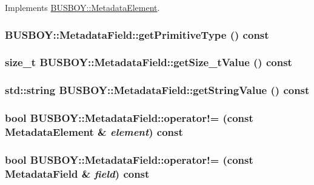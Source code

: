 Implements \hyperlink{classBUSBOY_1_1MetadataElement_a048a64f1d70affc5bfdd78a9958c5fb9}{BUSBOY::MetadataElement}.\hypertarget{classBUSBOY_1_1MetadataField_a6adf53e6993afff4870b23e690f48c60}{
\subsubsection[{getPrimitiveType}]{ BUSBOY::MetadataField::getPrimitiveType () const}}
\label{classBUSBOY_1_1MetadataField_a6adf53e6993afff4870b23e690f48c60}
\hypertarget{classBUSBOY_1_1MetadataField_ad8e4e7696464a6b043a2041678227482}{
\subsubsection[{getSize\_\-tValue}]{\setlength{\rightskip}{0pt plus 5cm}size\_\-t BUSBOY::MetadataField::getSize\_\-tValue () const}}
\label{classBUSBOY_1_1MetadataField_ad8e4e7696464a6b043a2041678227482}
\hypertarget{classBUSBOY_1_1MetadataField_aef00689ec315d36563245366a8e9df59}{
\subsubsection[{getStringValue}]{\setlength{\rightskip}{0pt plus 5cm}std::string BUSBOY::MetadataField::getStringValue () const}}
\label{classBUSBOY_1_1MetadataField_aef00689ec315d36563245366a8e9df59}
\hypertarget{classBUSBOY_1_1MetadataField_ac3a23c00a2964261c92da5e913bce6d1}{
\subsubsection[{operator!=}]{\setlength{\rightskip}{0pt plus 5cm}bool BUSBOY::MetadataField::operator!= (const {\bf MetadataElement} \& {\em element}) const}}
\label{classBUSBOY_1_1MetadataField_ac3a23c00a2964261c92da5e913bce6d1}
\hypertarget{classBUSBOY_1_1MetadataField_a112861961d422cf5613e67cea2eb49e6}{
\subsubsection[{operator!=}]{\setlength{\rightskip}{0pt plus 5cm}bool BUSBOY::MetadataField::operator!= (const {\bf MetadataField} \& {\em field}) const}}
\label{classBUSBOY_1_1MetadataField_a112861961d422cf5613e67cea2eb49e6}


